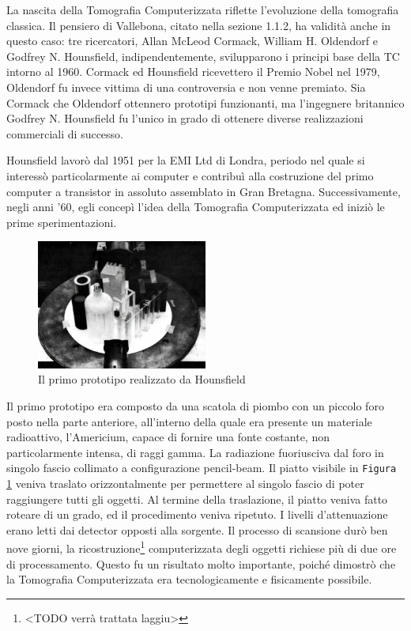 \documentclass[a4paper,11pt, oneside]{article}
\begin{document}
                        La nascita della Tomografia Computerizzata riflette l'evoluzione della tomografia classica. Il pensiero di Vallebona, citato nella sezione 1.1.2, ha validità anche in questo caso: tre ricercatori, Allan McLeod Cormack, William H. Oldendorf e Godfrey N. Hounsfield, indipendentemente, svilupparono i principi base della TC intorno al 1960. Cormack ed Hounsfield ricevettero il Premio Nobel nel 1979, Oldendorf fu invece vittima di una controversia\cite{nobel-debate} e non venne premiato. 
                        Sia Cormack che Oldendorf ottennero prototipi funzionanti, ma l'ingegnere britannico Godfrey N. Hounsfield fu l'unico in grado di ottenere diverse realizzazioni commerciali di successo.
                    \par
                        Hounsfield lavorò dal 1951 per la EMI Ltd di Londra, periodo nel quale si interessò particolarmente ai computer e contribuì alla costruzione del primo computer a transistor in assoluto assemblato in Gran Bretagna\cite{housfield-autobiografia}. Successivamente, negli anni '60, egli concepì l’idea della Tomografia Computerizzata ed iniziò le prime sperimentazioni.
                        
                        \begin{figure}[h]
                            \centering
                            \includegraphics[width=0.5\textwidth]{first-prototype}
                            \caption{Il primo prototipo realizzato da Hounsfield}
                            \label{fig:prototype}
                        \end{figure}
                        
                        Il primo prototipo era composto da una scatola di piombo con un piccolo foro posto nella parte anteriore, all’interno della quale era presente un materiale radioattivo, l’Americium, capace di fornire una fonte costante, non particolarmente intensa, di raggi gamma. La radiazione fuoriusciva dal foro in singolo fascio collimato a configurazione pencil-beam. Il piatto visibile in \texttt{Figura \ref{fig:prototype}} veniva traslato orizzontalmente per permettere al singolo fascio di poter raggiungere tutti gli oggetti. Al termine della traslazione, il piatto veniva fatto roteare di un grado, ed il procedimento veniva ripetuto. I livelli d'attenuazione erano letti dai detector opposti alla sorgente. Il processo di scansione durò ben nove giorni, la ricostruzione\footnote{<TODO verrà trattata laggiu>} computerizzata degli oggetti richiese più di due ore di processamento. Questo fu un risultato molto importante, poiché dimostrò che la Tomografia Computerizzata era tecnologicamente e fisicamente possibile.
                       
\end{document}
